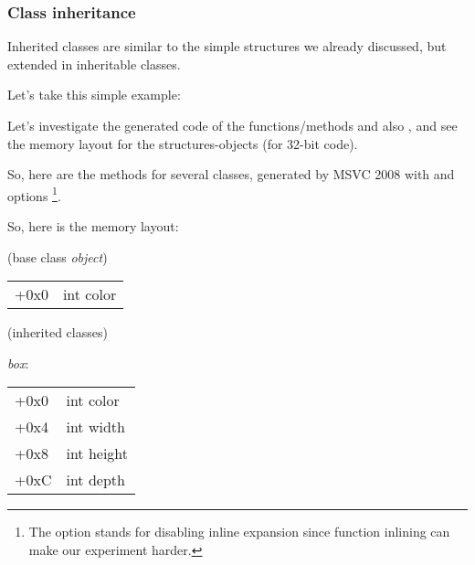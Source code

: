 \subsubsection{Class inheritance}
\label{cpp_inheritance}


Inherited classes are similar to the simple structures we already discussed, but extended 
in inheritable classes.

Let's take this simple example:




Let's investigate the generated code of the  functions/methods and also ,
and see the memory layout for the structures-objects (for 32-bit code).


So, here are the  methods for several classes, generated by MSVC 2008 with \Ox and \Obzero options
\footnote{
The \Obzero option stands for disabling inline expansion since function inlining
can make our experiment harder.}.







So, here is the memory layout:

(base class \emph{object})

\begin{center}
\begin{tabular}{ | l | l | }
\hline
  \tableheader{} \\
\hline
  +0x0 & int color \\
\hline
\end{tabular}
\end{center}

(inherited classes)

\emph{box}:

\begin{center}
\begin{tabular}{ | l | l | }
\hline
  \tableheader{} \\
\hline
  +0x0 & int color \\
\hline
  +0x4 & int width \\
\hline
  +0x8 & int height \\
\hline
  +0xC & int depth \\
\hline
\end{tabular}
\end{center}

